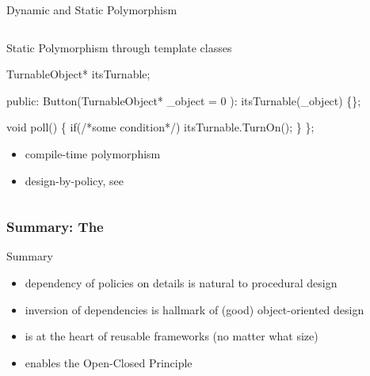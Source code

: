 \documentclass[9pt]{beamer}
\begin{document}
\begin{frame}[fragile]
\begin{block}{Dynamic and Static Polymorphism}
\begin{columns}[t]
\begin{column}{.45\textwidth}
\begin{block}{Static Polymorphism through template classes}
\begin{center}
\begin{semiverbatim}
TurnableObject* itsTurnable;

public:
  Button(TurnableObject* _object = 0 ): 
    itsTurnable(_object)
    \{\};

  void poll() \{
    if(/*some condition*/)
      itsTurnable.TurnOn();
    \}
\};
              \end{semiverbatim}
          \end{center}
        \normalsize
        \begin{itemize}
        \item compile-time polymorphism
        \item design-by-policy, see \cite{alexandrescu}
        \end{itemize}
      \end{block}
    \end{column}

  \end{columns}
  \end{block}
\end{frame}

\begin{frame}
  \frametitle{Summary: The \secname}
\begin{block}{Summary}
  \begin{itemize}
  \item dependency of policies on details is natural to procedural design
  \item inversion of dependencies is hallmark of (good) object-oriented design
  \item {\secname} is at the heart of reusable frameworks (no matter what size)
  \item enables the Open-Closed Principle
  \end{itemize}
\end{block}
\end{frame}
\end{document}
